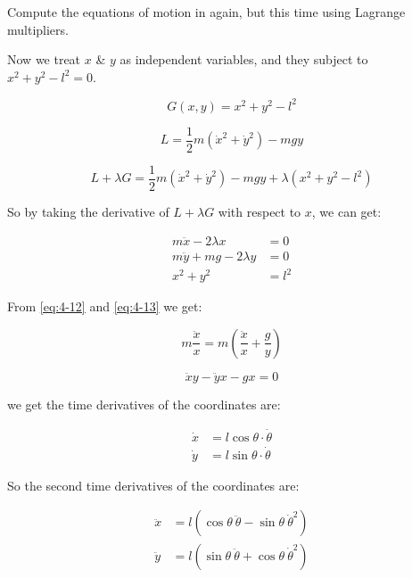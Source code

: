 \begin{example}
    Compute the equations of motion in  again, but this time using Lagrange multipliers.
\end{example}

Now we treat $x$ \& $y$ as independent variables, and they subject to $x^2+y^2-l^2=0$.
    
\begin{equation}
    G\left(x, y\right) = x^2 + y^2 - l^2
\end{equation}

\begin{equation}
    L = \frac{1}{2} m \left(\dot{x} ^ 2 + \dot{y} ^ 2\right) - mgy
\end{equation}

\begin{equation}
    L + \lambda G = \frac{1}{2} m \left(\dot{x} ^ 2 + \dot{y} ^ 2\right) - mgy + \lambda \left(x^2 + y^2 - l^2\right)
\end{equation}

So by taking the derivative of $L + \lambda G$ with respect to $x$, we can get:

\begin{align}
    \label{eq:4-12}
    m \ddot{x} - 2 \lambda x &= 0 \\
    \label{eq:4-13}
    m \ddot{y} + mg - 2 \lambda y &= 0 \\
    x ^ 2 + y ^ 2 &= l ^ 2
\end{align}

From \ref{eq:4-12} and \ref{eq:4-13} we get:

\begin{equation}
    m \frac{\ddot{x}}{x} = m \left(\frac{\ddot{x}}{x} + \frac{g}{y}\right)
\end{equation}

\begin{equation}
    \label{eq:4-16}
    \ddot{x} y - \ddot{y} x - gx = 0
\end{equation}

we get the time derivatives of the coordinates are:

\begin{align}
    \dot{x} &= l \cos{\theta} \cdot \dot{\theta} \\
    \dot{y} &= l \sin{\theta} \cdot \dot{\theta} 
\end{align}

So the second time derivatives of the coordinates are:

\begin{align}
    \label{eq:4-19}
    \ddot{x} &= l\left(\cos \theta \ \ddot{\theta} - \sin \theta \ \dot{\theta}^2\right) \\
    \label{eq:4-20}
    \ddot{y} &= l\left(\sin \theta \ \ddot{\theta} + \cos \theta \ \dot{\theta}^2\right)
\end{align}

